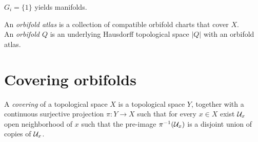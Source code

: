 \begin{remark}
$G_i=\{1\}$ yields manifolds.
\end{remark}

\begin{defn}
An \emph{orbifold atlas} is a collection of compatible orbifold charts that cover $X$.\\
An \emph{orbifold $Q$} is an underlying Hausdorff topological space $|Q|$ with an orbifold atlas.
\end{defn}

\section{Covering orbifolds}

A \emph{covering} of a topological space $X$ is a topological space $Y$, together with a
continuous surjective projection $\pi: Y\rightarrow X$ such that for every $x\in X$ exist
$\mathcal{U}_x$ open neighborhood of $x$ such that the pre-image $\pi^{-1}(\mathcal{U}_x)$ is a disjoint
union of copies of $\mathcal{U}_x$.


